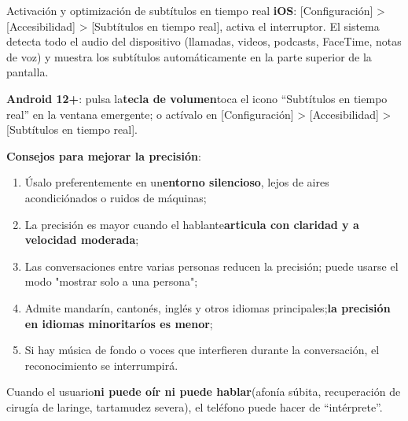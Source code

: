 \begin{tcbinfo}{Activación y optimización de subtítulos en tiempo real}
\textbf{iOS}: [Configuración] > [Accesibilidad] > [Subtítulos en tiempo real], activa el interruptor. El sistema detecta todo el audio del dispositivo (llamadas, videos, podcasts, FaceTime, notas de voz) y muestra los subtítulos automáticamente en la parte superior de la pantalla.

\textbf{Android 12+}: pulsa la\textbf{tecla de volumen}toca el icono “Subtítulos en tiempo real” en la ventana emergente; o actívalo en [Configuración] > [Accesibilidad] > [Subtítulos en tiempo real].

\textbf{Consejos para mejorar la precisión}:

\begin{enumerate}
  \item Úsalo preferentemente en un\textbf{entorno silencioso}, lejos de aires acondiciónados o ruidos de máquinas;
  \item La precisión es mayor cuando el hablante\textbf{articula con claridad y a velocidad moderada};
  \item Las conversaciones entre varias personas reducen la precisión; puede usarse el modo "mostrar solo a una persona";
  \item Admite mandarín, cantonés, inglés y otros idiomas principales;\textbf{la precisión en idiomas minoritaríos es menor};
  \item Si hay música de fondo o voces que interfieren durante la conversación, el reconocimiento se interrumpirá.
\end{enumerate}

\end{tcbinfo}


Cuando el usuario\textbf{ni puede oír ni puede hablar}(afonía súbita, recuperación de cirugía de laringe, tartamudez severa), el teléfono puede hacer de “intérprete”.

